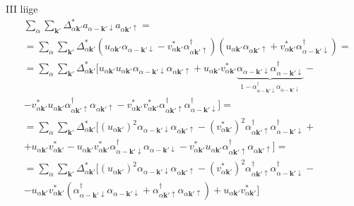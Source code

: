 \documentclass[class=article, crop=false]{standalone}
\begin{document}
III liige
\begin{equation}\label{key}
	\begin{split}
		& \sum_{ \alpha} \sum_{ \mathbf{k}'} \Delta_{ \alpha \mathbf{k}'}^{ \ast} a_{ \alpha -\mathbf{k}' \downarrow} a_{ \alpha \mathbf{k}' \uparrow} = \\
		& = \sum_{ \alpha} \sum_{ \mathbf{k}'} \Delta_{ \alpha \mathbf{k}'}^{ \ast} \left( u_{ \alpha \mathbf{k}'} \alpha_{ \alpha - \mathbf{k}' \downarrow} - v_{ \alpha \mathbf{k}'}^{ \ast} \alpha_{ \alpha \mathbf{k}' \uparrow}^{ \dagger} \right) \left( u_{ \alpha \mathbf{k}'} \alpha_{ \alpha \mathbf{k}' \uparrow} + v_{ \alpha \mathbf{k}'}^{ \ast} \alpha_{ \alpha - \mathbf{k}' \downarrow}^{ \dagger} \right) = \\
		& = \sum_{ \alpha} \sum_{ \mathbf{k}'} \Delta_{ \alpha \mathbf{k}'}^{ \ast} 
		[ u_{ \alpha \mathbf{k}'} u_{ \alpha \mathbf{k}'} \alpha_{ \alpha - \mathbf{k}' \downarrow} \alpha_{ \alpha \mathbf{k}' \uparrow} 
		+ u_{ \alpha \mathbf{k}'} v_{ \alpha \mathbf{k}'}^{ \ast} \underbrace{\alpha_{ \alpha - \mathbf{k}' \downarrow} \alpha_{ \alpha - \mathbf{k}' \downarrow}^{ \dagger}}_{1 - \alpha_{ \alpha - \mathbf{k}' \downarrow}^{ \dagger} \alpha_{ \alpha - \mathbf{k}' \downarrow}} - \\
		& - v_{ \alpha \mathbf{k}'}^{ \ast} u_{ \alpha \mathbf{k}'} \alpha_{ \alpha \mathbf{k}' \uparrow}^{ \dagger} \alpha_{ \alpha \mathbf{k}' \uparrow} 
		- v_{ \alpha \mathbf{k}'}^{ \ast} v_{ \alpha \mathbf{k}'}^{ \ast} \alpha_{ \alpha \mathbf{k}' \uparrow}^{ \dagger} \alpha_{ \alpha - \mathbf{k}' \downarrow}^{ \dagger} ] = \\
		& = \sum_{ \alpha} \sum_{ \mathbf{k}'} \Delta_{ \alpha \mathbf{k}'}^{ \ast} 
		[ \left( u_{ \alpha \mathbf{k}'} \right)^{2} \alpha_{ \alpha - \mathbf{k}' \downarrow} \alpha_{ \alpha \mathbf{k}' \uparrow} 
		- \left( v_{ \alpha \mathbf{k}'}^{ \ast}\right)^{2} \alpha_{ \alpha \mathbf{k}' \uparrow}^{ \dagger} \alpha_{ \alpha - \mathbf{k}' \downarrow}^{ \dagger} + \\
		& + u_{ \alpha \mathbf{k}'} v_{ \alpha \mathbf{k}'}^{ \ast} - u_{ \alpha \mathbf{k}'} v_{ \alpha \mathbf{k}'}^{ \ast} \alpha_{ \alpha - \mathbf{k}' \downarrow}^{ \dagger} \alpha_{ \alpha - \mathbf{k}' \downarrow} - v_{ \alpha \mathbf{k}'}^{ \ast} u_{ \alpha \mathbf{k}'} \alpha_{ \alpha \mathbf{k}' \uparrow}^{ \dagger} \alpha_{ \alpha \mathbf{k}' \uparrow} ] = \\
		& = \sum_{ \alpha} \sum_{ \mathbf{k}'} \Delta_{ \alpha \mathbf{k}'}^{ \ast} 
		[ \left( u_{ \alpha \mathbf{k}'} \right)^{2} \alpha_{ \alpha - \mathbf{k}' \downarrow} \alpha_{ \alpha \mathbf{k}' \uparrow} 
		- \left( v_{ \alpha \mathbf{k}'}^{ \ast}\right)^{2} \alpha_{ \alpha \mathbf{k}' \uparrow}^{ \dagger} \alpha_{ \alpha - \mathbf{k}' \downarrow}^{ \dagger} - \\
		& - u_{ \alpha \mathbf{k}'} v_{ \alpha \mathbf{k}'}^{ \ast} \left( \alpha_{ \alpha - \mathbf{k}' \downarrow}^{ \dagger} \alpha_{ \alpha - \mathbf{k}' \downarrow} + \alpha_{ \alpha \mathbf{k}' \uparrow}^{ \dagger} \alpha_{ \alpha \mathbf{k}' \uparrow} \right) + u_{ \alpha \mathbf{k}'} v_{ \alpha \mathbf{k}'}^{ \ast} ]
	\end{split}
\end{equation}
\end{document}
